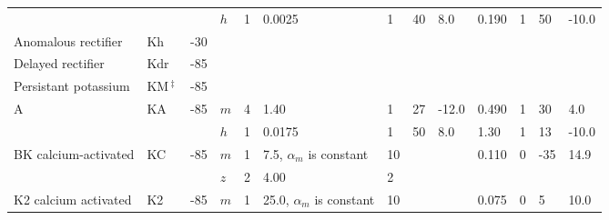 \documentclass[12pt]{article}
\begin{document}
\begin{table}[h]
\begin{tabular}{ l l l l l l l l l l l l l }
                                             &                                                                          &              & $h$               & 1      & 0.0025                                        & 1      & 40    & 8.0     & 0.190    & 1      & 50    & -10.0  \\
   Anomalous rectifier       & Kh\,\cite{Spain-W-J:1987ij}                         & -30       &                       &         &                                                      &         &          &           &                &         &          &            \\
   Delayed rectifier            & Kdr\,\cite{Yamada-W:1989bs}                    & -85       &                       &         &                                                      &         &          &           &                &         &          &            \\
   Persistant potassium    & KM\,$^\ddag$\,\cite{Yamada-W:1989bs} & -85       &                       &         &                                                      &         &          &           &                &         &          &            \\
   A                                       & KA                                                                   & -85       & $m$              & 4      & 1.40                                             & 1      & 27    & -12.0  & 0.490    & 1      & 30    & 4.0     \\
                                             &                                                                         &              & $h$               & 1      & 0.0175                                        & 1      & 50    & 8.0    & 1.30       & 1      & 13    & -10.0  \\
   BK calcium-activated    & KC                                                                  & -85       & $m$               & 1      & 7.5, $\alpha_m$ is constant   & 10    &          &           & 0.110    & 0      & -35   & 14.9   \\
                                             &                                                                         &              & $z$                & 2      & 4.00                                            & 2      &          &           &                &         &          &            \\
   K2 calcium activated     & K2                                                                   & -85       & $m$              & 1      & 25.0, $\alpha_m$ is constant & 10   &          &           & 0.075     & 0     & 5       & 10.0   \\

\end{tabular}
\end{table}
\end{document}
